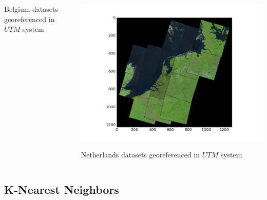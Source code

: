 \documentclass[c]{beamer}
\begin{document}
\begin{frame}
\begin{itemize}
{\begin{columns}
\begin{column}{0.33\textwidth}
\begin{overlayarea}{\linewidth}{3cm}
  \end{overlayarea}
  \begin{overlayarea}{\linewidth}{1cm}
    \centering
    \tiny Belgium datasets georeferenced in $UTM$ system\par
  \end{overlayarea}
  \end{column}
  \begin{column}{0.33\textwidth}
  \begin{overlayarea}{\linewidth}{3cm}
    \centering\vfill
    \includegraphics[scale=0.20]{images/Netherlands/covering-selection.png}
  \end{overlayarea}
  \begin{overlayarea}{\linewidth}{1cm}
    \centering
    \tiny Netherlands datasets georeferenced in $UTM$ system\par
  \end{overlayarea}
  \end{column}
 \end{columns}
}
\end{itemize}

\end{frame}

\subsection{K-Nearest Neighbors}
\end{document}
